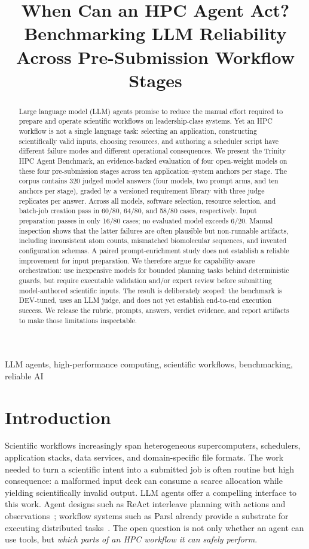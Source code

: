 \documentclass[conference]{IEEEtran}
\title{When Can an HPC Agent Act?\\
Benchmarking LLM Reliability Across Pre-Submission Workflow Stages}
\author{\IEEEauthorblockN{Anonymous Authors}
\IEEEauthorblockA{Anonymous Institution\\
Anonymous Email}}
\begin{document}
\maketitle

\begin{abstract}
Large language model (LLM) agents promise to reduce the manual effort required to prepare and operate scientific workflows on leadership-class systems. Yet an HPC workflow is not a single language task: selecting an application, constructing scientifically valid inputs, choosing resources, and authoring a scheduler script have different failure modes and different operational consequences. We present the Trinity HPC Agent Benchmark, an evidence-backed evaluation of four open-weight models on these four pre-submission stages across ten application--system anchors per stage. The corpus contains 320 judged model answers (four models, two prompt arms, and ten anchors per stage), graded by a versioned requirement library with three judge replicates per answer. Across all models, software selection, resource selection, and batch-job creation pass in 60/80, 64/80, and 58/80 cases, respectively. Input preparation passes in only 16/80 cases; no evaluated model exceeds 6/20. Manual inspection shows that the latter failures are often plausible but non-runnable artifacts, including inconsistent atom counts, mismatched biomolecular sequences, and invented configuration schemas. A paired prompt-enrichment study does not establish a reliable improvement for input preparation. We therefore argue for capability-aware orchestration: use inexpensive models for bounded planning tasks behind deterministic guards, but require executable validation and/or expert review before submitting model-authored scientific inputs. The result is deliberately scoped: the benchmark is DEV-tuned, uses an LLM judge, and does not yet establish end-to-end execution success. We release the rubric, prompts, answers, verdict evidence, and report artifacts to make those limitations inspectable.
\end{abstract}

\begin{IEEEkeywords}
LLM agents, high-performance computing, scientific workflows, benchmarking, reliable AI
\end{IEEEkeywords}

\section{Introduction}
Scientific workflows increasingly span heterogeneous supercomputers, schedulers, application stacks, data services, and domain-specific file formats. The work needed to turn a scientific intent into a submitted job is often routine but high consequence: a malformed input deck can consume a scarce allocation while yielding scientifically invalid output. LLM agents offer a compelling interface to this work. Agent designs such as ReAct interleave planning with actions and observations~\cite{yao2023react}; workflow systems such as Parsl already provide a substrate for executing distributed tasks~\cite{babuji2019parsl}. The open question is not only whether an agent can use tools, but \emph{which parts of an HPC workflow it can safely perform}. 
\end{document}
